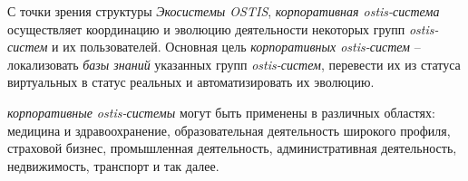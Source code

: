 С точки зрения структуры \textit{Экосистемы OSTIS}, \textit{корпоративная ostis-система} осуществляет координацию и эволюцию деятельности некоторых групп \textit{ostis-систем} и их пользователей. 
Основная цель \textit{корпоративных ostis-систем} – локализовать \textit{базы знаний} указанных групп \textit{ostis-систем}, перевести их из статуса виртуальных в статус реальных и автоматизировать их эволюцию.


\textit{корпоративные ostis-системы} могут быть применены в различных областях: медицина и здравоохранение, образовательная деятельность широкого профиля, страховой бизнес, промышленная деятельность, административная деятельность, недвижимость, транспорт и так далее.

